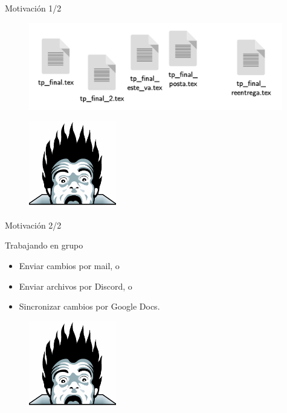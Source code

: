 
\begin{frame}{Motivación 1/2}

    \begin{figure}[ht]
        \begin{center}
            \includegraphics[height=1.5in]{images/caos.pdf}
        \end{center}
    \end{figure}

    \pause
    \begin{figure}[ht]
        \begin{center}
            \includegraphics[height=1.5in]{images/horror.png}
        \end{center}
    \end{figure}
\end{frame}
\begin{frame}{Motivación 2/2}

    \begin{block}{Trabajando en grupo}
        \begin{itemize}
            \item Enviar cambios por mail, o
            \pause
            \item Enviar archivos por Discord, o
            \pause
            \item Sincronizar cambios por Google Docs.
        \end{itemize}
    \end{block}

    \pause
    \begin{figure}[h]
        \begin{center}
            \includegraphics[height=1.5in]{images/horror.png}
        \end{center}
    \end{figure}

\end{frame}

